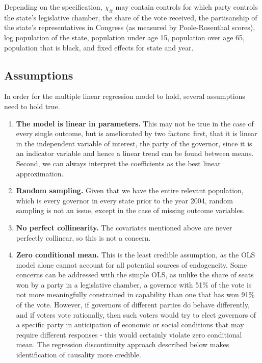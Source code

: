 \documentclass{article}
\begin{document}
Depending on the specification, $\chi_{it}$ may contain controls for which party controls the state's legislative chamber, the share of the vote received, the partisanship of the state's representatives in Congress (as measured by Poole-Rosenthal scores), log population of the state, population under age 15, population over age 65, population that is black, and fixed effects for state and year. 

\subsection{Assumptions}

In order for the multiple linear regression model to hold, several assumptions need to hold true.
\begin{enumerate}
\item \textbf{The model is linear in parameters.} This may not be true in the case of every single outcome, but is ameliorated by two factors: first, that it is linear in the independent variable of interest, the party of the governor, since it is an indicator variable and hence a linear trend can be found between means. Second, we can always interpret the coefficients as the best linear approximation.

\item \textbf{Random sampling.} Given that we have the entire relevant population, which is every governor in every state prior to the year 2004, random sampling is not an issue, except in the case of missing outcome variables. 

\item \textbf{No perfect collinearity.} The covariates mentioned above are never perfectly collinear, so this is not a concern. 

\item \textbf{Zero conditional mean.} This is the least credible assumption, as the OLS model alone cannot account for all potential sources of endogeneity. Some concerns can be addressed with the simple OLS, as unlike the share of seats won by a party in a legislative chamber, a governor with 51\% of the vote is not more meaningfully constrained in capability than one that has won 91\% of the vote. However, if governors of different parties do behave differently, and if voters vote rationally, then such voters would try to elect governors of a specific party in anticipation of economic or social conditions that may require different responses - this would certainly violate zero conditional mean. The regression discontinuity approach described below makes identification of causality more credible.


\end{enumerate}
\end{document}
